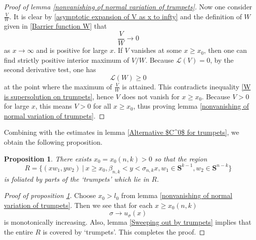 \documentclass[pdflatex,sn-mathphys-num]{sn-jnl}
\newtheorem{proposition}[theorem]{Proposition}
\begin{document}
\begin{proof}[Proof of lemma \ref{nonvanishing of normal variation of trumpets}]
    Now one consider $\frac{V}{W}$. It is clear by \eqref{asymptotic expansion of V as x to infty} and the definition of $W$ given in \eqref{Barrier function W} that $$\frac{V}{W}\to 0$$ as $x \to \infty$ and is positive for large $x$. If $V$ vanishes at some $x \geq x_0$, then one can find strictly positive interior maximum of $V/W$. Because $\mathcal{L}(V) = 0$, by the second derivative test, one has
    $$\mathcal{L}(W) \geq 0$$
    at the point where the maximum of $\frac{V}{W}$ is attained. This contradicts inequality \eqref{W is supersolution on trumpets}, hence $V$ does not vanish for $x \geq x_0$. Because $V > 0$ for large $x$, this means $V > 0$ for all $x \geq x_0$, thus proving lemma \ref{nonvanishing of normal variation of trumpets}.
\end{proof}
Combining with the estimates in lemma \ref{Alternative $C^0$ for trumpets}, we obtain the following proposition.
\begin{proposition}\label{FOliation by lower trumpets}
    There exists $x_0 = x_0(n,k) > 0$ so that the region
    $$R = \{(xw_1, yw_2) \ | \ x \geq x_0, \beta_{n,k} < y < \sigma_{n,k}x , w_1 \in \mathbf{S}^{k-1}, w_2 \in \mathbf{S}^{n-k}\}$$
    is foliated by parts of the `trumpets' which lie in $R$.
\end{proposition}
\begin{proof}[Proof of proposition \ref{FOliation by lower trumpets}]
Choose $x_0 > l_0$ from lemma \ref{nonvanishing of normal variation of trumpets}. Then we see that for each $x \geq x_0(n,k)$ 
$$\sigma \to u_{\sigma}(x)$$
is monotonically increasing. Also, lemma \ref{Sweeping out by trumpets} implies that the entire $R$ is covered by `trumpets'. This completes the proof.
\end{proof}
\end{document}
